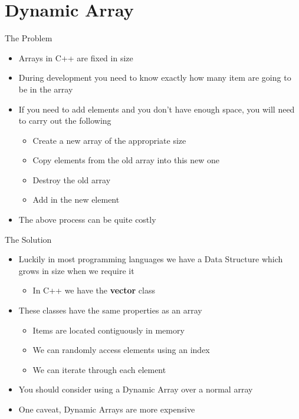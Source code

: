 \part{Dynamic Array}
\frame{\partpage}

\begin{frame}{The Problem}
	\begin{itemize}
		\pause \item Arrays in C++ are fixed in size
		\pause \item During development you need to know exactly how many item are going to be in the array
		\pause \item If you need to add elements and you don't have enough space, you will need to carry out the following
		\begin{itemize}
			\pause \item Create a new array of the appropriate size 
			\pause \item Copy elements from the old array into this new one
			\pause \item Destroy the old array
			\pause \item Add in the new element
		\end{itemize}
		\pause \item The above process can be quite costly
	\end{itemize}
\end{frame}

\begin{frame}{The Solution}
	\begin{itemize}
		\pause \item Luckily in most programming languages we have a Data Structure which grows in size when we require it 
		\begin{itemize}
			\pause \item In C++ we have the \textbf{vector} class
		\end{itemize}
		\pause \item These classes have the same properties as an array
		\begin{itemize}
			\pause \item Items are located contiguously in memory 
			\pause \item We can randomly access elements using an index
			\pause \item We can iterate through each element
		\end{itemize}
		\pause \item You should consider using a Dynamic Array over a normal array
		\pause \item One caveat, Dynamic Arrays are more expensive
	\end{itemize}
\end{frame}

